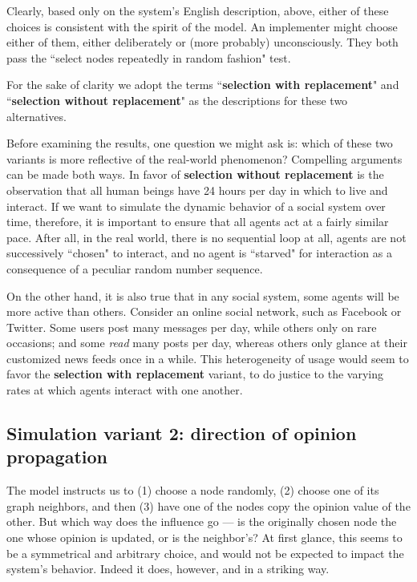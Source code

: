 Clearly, based only on the system's English description, above, either of
these choices is consistent with the spirit of the model. An implementer might
choose either of them, either deliberately or (more probably) unconsciously.
They both pass the ``select nodes repeatedly in random fashion" test.

For the sake of clarity we adopt the terms ``\textbf{selection with
replacement}" and ``\textbf{selection without replacement}" as the
descriptions for these two alternatives.

Before examining the results, one question we might ask is: which of these two
variants is more reflective of the real-world phenomenon? Compelling arguments
can be made both ways. In favor of \textbf{selection without replacement} is
the observation that all human beings have 24 hours per day in which to live
and interact. If we want to simulate the dynamic behavior of a social system
over time, therefore, it is important to ensure that all agents act at a
fairly similar pace. After all, in the real world, there is no sequential loop
at all, agents are not successively ``chosen" to interact, and no agent is
``starved" for interaction as a consequence of a peculiar random number
sequence.

On the other hand, it is also true that in any social system, some agents will
be more active than others. Consider an online social network, such as
Facebook or Twitter. Some users post many messages per day, while others only
on rare occasions; and some \textit{read} many posts per day, whereas others
only glance at their customized news feeds once in a while. This heterogeneity
of usage would seem to favor the \textbf{selection with replacement} variant,
to do justice to the varying rates at which agents interact with one another.

\subsection{Simulation variant 2: direction of opinion propagation}

The model instructs us to (1) choose a node randomly, (2) choose one of its
graph neighbors, and then (3) have one of the nodes copy the opinion value of
the other. But which way does the influence go --- is the originally chosen
node the one whose opinion is updated, or is the neighbor's? At first glance,
this seems to be a symmetrical and arbitrary choice, and would not be expected
to impact the system's behavior. Indeed it does, however, and in a striking
way.

